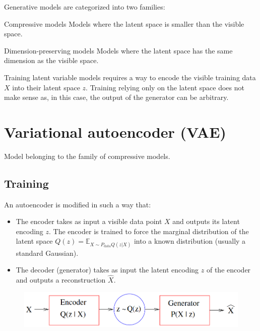 Generative models are categorized into two families:
\begin{descriptionlist}
    \item[Compressive models] 
        Models where the latent space is smaller than the visible space.

    \item[Dimension-preserving models] 
        Models where the latent space has the same dimension as the visible space.
\end{descriptionlist}

\begin{remark}
    Training latent variable models requires a way to encode the visible training data $X$ into their latent space $z$.
    Training relying only on the latent space does not make sense as, in this case, the output of the generator can be arbitrary.
\end{remark}



\section{Variational autoencoder (VAE)}

Model belonging to the family of compressive models.

\subsection{Training}

An autoencoder is modified in such a way that:
\begin{itemize}
    \item The encoder takes as input a visible data point $X$ and outputs its latent encoding $z$.
        The encoder is trained to force the marginal distribution of the latent space $Q(z) = \mathbb{E}_{X \sim P_\text{data} Q(z|X)}$ 
        into a known distribution (usually a standard Gaussian).

    \item The decoder (generator) takes as input the latent encoding $z$ of the encoder and outputs a reconstruction $\hat{X}$.
\end{itemize}

\begin{figure}[H]
    \centering
    \includegraphics[width=0.5\linewidth]{./img/vae.png}
\end{figure}

